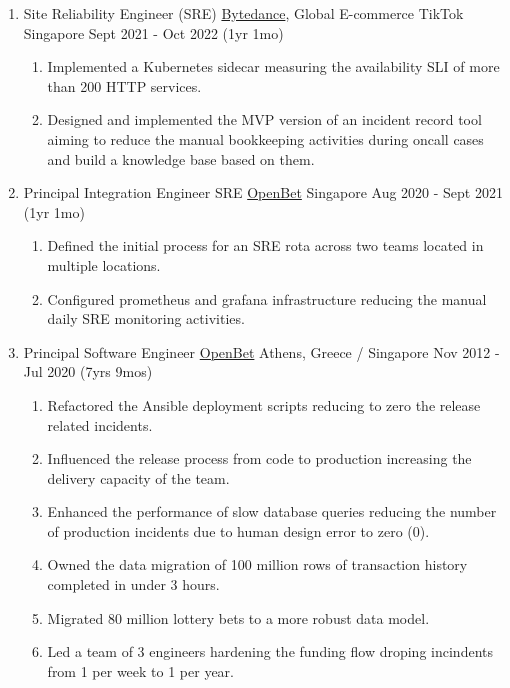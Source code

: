 \documentclass{CVSoftwareEngineer}
\begin{document}
\begin{enumerate}[labelwidth=!, labelindent=0pt, leftmargin=*, rightmargin=15pt]
		\item[] \cvExperience
			{Site Reliability Engineer (SRE)}
			{\href{https://www.bytedance.com/en}{Bytedance}, Global E-commerce TikTok}
			{Singapore}
			{Sept 2021 - Oct 2022 (1yr 1mo)}
			{
				\begin{enumerate}[labelwidth=!, labelindent=0pt, nosep, leftmargin=*]
					\item[\textasteriskcentered] Implemented a Kubernetes sidecar measuring the availability SLI of more than 200 HTTP services.
					\item[\textasteriskcentered] Designed and implemented the MVP version of an incident record tool aiming to reduce the manual bookkeeping activities during oncall cases and build a knowledge base based on them.
				\end{enumerate}
			}

		\item[] \cvExperience
			{Principal Integration Engineer \textbar\space SRE}
			{\href{https://www.openbet.com/}{OpenBet}}
			{Singapore}
			{Aug 2020 - Sept 2021 (1yr 1mo)}
			{\begin{enumerate}[labelwidth=!, labelindent=0pt, nosep, leftmargin=*]
					\item[\textasteriskcentered] Defined the initial process for an SRE rota across two teams located in multiple locations.
					\item[\textasteriskcentered] Configured prometheus and grafana infrastructure reducing the manual daily SRE monitoring activities.
				\end{enumerate}
			}

		\item[] \cvExperience
			{Principal Software Engineer}
			{\href{https://www.openbet.com/}{OpenBet}}
			{Athens, Greece / Singapore}
			{Nov 2012 - Jul 2020 (7yrs 9mos)}
			{\begin{enumerate}[labelwidth=!, labelindent=0pt, nosep, leftmargin=*]
					\item[\textasteriskcentered] Refactored the Ansible deployment scripts
					reducing to zero the release related incidents.
					\item[\textasteriskcentered] Influenced the release process from code to
					production increasing the delivery capacity of the team.
					\item[\textasteriskcentered] Enhanced the performance of slow database queries reducing
						the number of production incidents due to human design error to zero (0).
						\item[\textasteriskcentered] Owned the data migration of 100 million rows of
						transaction history completed in under 3 hours.
					\item[\textasteriskcentered] Migrated 80 million lottery bets to a more robust data model.
					\item[\textasteriskcentered] Led a team of 3 engineers hardening the
						funding flow droping incindents from 1 per week to 1 per year.
				\end{enumerate}
			}
	\end{enumerate}
\end{document}
